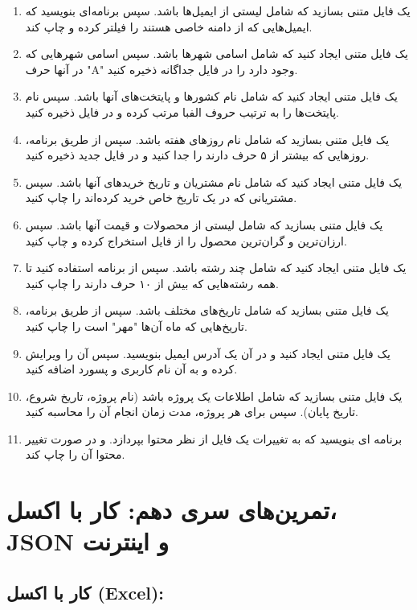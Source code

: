 \documentclass[b5paper,12pt]{article}
\begin{document}
	\begin{enumerate}
		\item یک فایل متنی بسازید که شامل لیستی از ایمیل‌ها باشد. سپس برنامه‌ای بنویسید که ایمیل‌هایی که از دامنه خاصی هستند را فیلتر کرده و چاپ کند.
		\item یک فایل متنی ایجاد کنید که شامل اسامی شهرها باشد. سپس اسامی شهرهایی که در آنها حرف "A" وجود دارد را در فایل جداگانه ذخیره کنید.
		\item یک فایل متنی ایجاد کنید که شامل نام کشورها و پایتخت‌های آنها باشد. سپس نام پایتخت‌ها را به ترتیب حروف الفبا مرتب کرده و در فایل ذخیره کنید.
		\item یک فایل متنی بسازید که شامل نام روزهای هفته باشد. سپس از طریق برنامه، روزهایی که بیشتر از ۵ حرف دارند را جدا کنید و در فایل جدید ذخیره کنید.
		\item یک فایل متنی ایجاد کنید که شامل نام مشتریان و تاریخ خریدهای آنها باشد. سپس مشتریانی که در یک تاریخ خاص خرید کرده‌اند را چاپ کنید.
		\item یک فایل متنی بسازید که شامل لیستی از محصولات و قیمت آنها باشد. سپس ارزان‌ترین و گران‌ترین محصول را از فایل استخراج کرده و چاپ کنید.
		\item یک فایل متنی ایجاد کنید که شامل چند رشته باشد. سپس از برنامه استفاده کنید تا همه رشته‌هایی که بیش از ۱۰ حرف دارند را چاپ کنید.
		\item یک فایل متنی بسازید که شامل تاریخ‌های مختلف باشد. سپس از طریق برنامه، تاریخ‌هایی که ماه آن‌ها "مهر" است را چاپ کنید.
		\item یک فایل متنی ایجاد کنید و در آن یک آدرس ایمیل بنویسید. سپس آن را ویرایش کرده و به آن نام کاربری و پسورد اضافه کنید.
		\item یک فایل متنی بسازید که شامل اطلاعات یک پروژه باشد (نام پروژه، تاریخ شروع، تاریخ پایان). سپس برای هر پروژه، مدت زمان انجام آن را محاسبه کنید.
		\item برنامه ای بنویسید که به تغییرات یک فایل از نظر محتوا بپردازد. و در صورت تغییر محتوا آن را چاپ کند.
	\end{enumerate}
	

	\newpage
	\section*{تمرین‌های سری دهم: کار با اکسل، JSON و اینترنت}
	
	\subsection*{کار با اکسل (Excel):}
	
\end{document}
